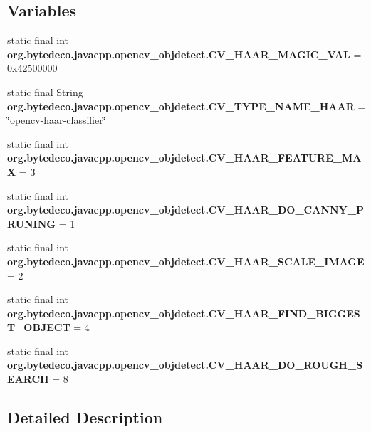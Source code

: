 \subsection*{Variables}
\begin{DoxyCompactItemize}
\item 
\mbox{\label{group__objdetect__c_gaadc9ca812f6376a98af1fe575a5726f7}} 
static final int {\bfseries org.\+bytedeco.\+javacpp.\+opencv\+\_\+objdetect.\+C\+V\+\_\+\+H\+A\+A\+R\+\_\+\+M\+A\+G\+I\+C\+\_\+\+V\+AL} = 0x42500000
\item 
\mbox{\label{group__objdetect__c_gab4c6556e0238167fdd3d7727abadbb9a}} 
static final String {\bfseries org.\+bytedeco.\+javacpp.\+opencv\+\_\+objdetect.\+C\+V\+\_\+\+T\+Y\+P\+E\+\_\+\+N\+A\+M\+E\+\_\+\+H\+A\+AR} = \char`\"{}opencv-\/haar-\/classifier\char`\"{}
\item 
\mbox{\label{group__objdetect__c_gace767d4d14dd82212ecdf70861179c8c}} 
static final int {\bfseries org.\+bytedeco.\+javacpp.\+opencv\+\_\+objdetect.\+C\+V\+\_\+\+H\+A\+A\+R\+\_\+\+F\+E\+A\+T\+U\+R\+E\+\_\+\+M\+AX} = 3
\item 
\mbox{\label{group__objdetect__c_gadb275d207b671ced1dda214395da67e1}} 
static final int {\bfseries org.\+bytedeco.\+javacpp.\+opencv\+\_\+objdetect.\+C\+V\+\_\+\+H\+A\+A\+R\+\_\+\+D\+O\+\_\+\+C\+A\+N\+N\+Y\+\_\+\+P\+R\+U\+N\+I\+NG} = 1
\item 
\mbox{\label{group__objdetect__c_ga4c3f1323b7fba0dc6ad9e9a452d832a6}} 
static final int {\bfseries org.\+bytedeco.\+javacpp.\+opencv\+\_\+objdetect.\+C\+V\+\_\+\+H\+A\+A\+R\+\_\+\+S\+C\+A\+L\+E\+\_\+\+I\+M\+A\+GE} = 2
\item 
\mbox{\label{group__objdetect__c_ga321b27446217a7f8035b390ea7216a6c}} 
static final int {\bfseries org.\+bytedeco.\+javacpp.\+opencv\+\_\+objdetect.\+C\+V\+\_\+\+H\+A\+A\+R\+\_\+\+F\+I\+N\+D\+\_\+\+B\+I\+G\+G\+E\+S\+T\+\_\+\+O\+B\+J\+E\+CT} = 4
\item 
\mbox{\label{group__objdetect__c_gad698ad95aeb09722b57c4be5f3a4d2cd}} 
static final int {\bfseries org.\+bytedeco.\+javacpp.\+opencv\+\_\+objdetect.\+C\+V\+\_\+\+H\+A\+A\+R\+\_\+\+D\+O\+\_\+\+R\+O\+U\+G\+H\+\_\+\+S\+E\+A\+R\+CH} = 8
\end{DoxyCompactItemize}


\subsection{Detailed Description}
